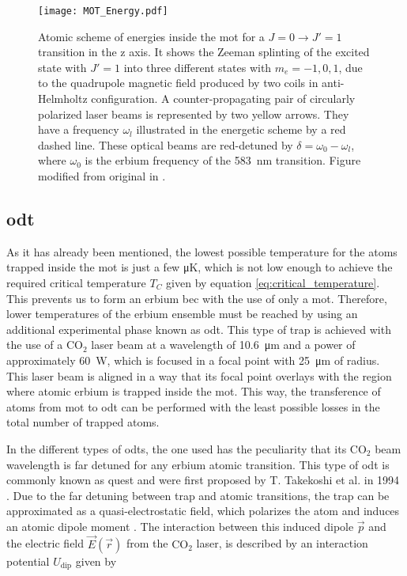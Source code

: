 \begin{figure}[!htbp]\centering
	\texttt{[image: MOT\_Energy.pdf]}
	\caption[Atomic scheme of energies inside the \ac{mot} for a $J=0 \rightarrow J'=1$ transition in the z axis]{Atomic scheme of energies inside the \ac{mot} for a $J=0 \rightarrow J'=1$ transition in the z axis. It shows the Zeeman splinting of the excited state with $J'=1$ into three different states with $m_e = -1, 0, 1$, due to the quadrupole magnetic field produced by two coils in anti-Helmholtz configuration. A counter-propagating pair of circularly polarized laser beams is represented by two yellow arrows. They have a frequency $\omega_l$ illustrated in the energetic scheme by a red dashed line. These optical beams are red-detuned by $\delta = \omega_0 - \omega_l$, where $\omega_0$ is the erbium frequency of the \SI{583}{\nano\meter} transition. Figure modified from original in \cite{Metcalf1999}.}\label{fig:MOT_Energy}
\end{figure}

\subsection{\Acl{odt}}

As it has already been mentioned, the lowest possible temperature for the atoms trapped inside the \ac{mot} is just a few \si{\micro\kelvin}, which is not low enough to achieve the required critical temperature $T_C$ given by equation \eqref{eq:critical_temperature}. This prevents us to form an erbium \acl{bec} with the use of only a \acl{mot}. Therefore, lower temperatures of the erbium ensemble must be reached by using an additional experimental phase known as \Acf{odt}. This type of trap is achieved with the use of a $\text{CO}_2$ laser beam at a wavelength of \SI{10.6}{\micro\meter} and a power of approximately \SI{60}{\watt}, which is focused in a focal point with \SI{25}{\micro\meter} of radius. This laser beam is aligned in a way that its focal point overlays with the region where atomic erbium is trapped inside the \ac{mot}. This way, the transference of atoms from \ac{mot} to \ac{odt} can be performed with the least possible losses in the total number of trapped atoms.

In the different types of \acp{odt}, the one used has the peculiarity that its $\text{CO}_2$ beam wavelength is far detuned for any erbium atomic transition. This type of \ac{odt} is commonly known as \Acf{quest} and were first proposed by T. Takekoshi et al. in 1994 \cite{Takekoshi1995}. Due to the far detuning between trap and atomic transitions, the trap can be approximated as a quasi-electrostatic field, which polarizes the atom and induces an atomic dipole moment \cite{Grimm2000}. The interaction between this induced dipole $\vec{p}$ and the electric field $\vec{E}(\vec{r})$ from the $\text{CO}_2$ laser, is described by an interaction potential $U_{\text{dip}}$ given by

